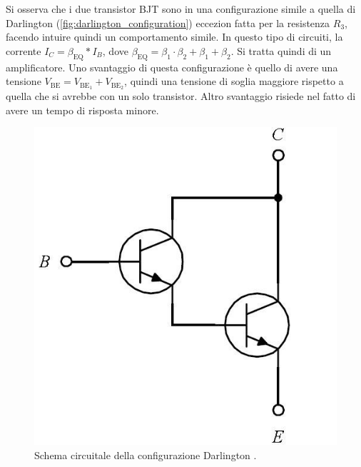 Si osserva che i due transistor BJT sono in una configurazione simile a quella di Darlington (\autoref*{fig:darlington_configuration}) eccezion 
fatta per la resistenza $R_3$, facendo intuire quindi un comportamento simile. In questo tipo di circuiti, la corrente $I_C=\beta_\text{EQ}*I_B$, 
dove $\beta_\text{EQ}=\beta_1 \cdot \beta_2+\beta_1+\beta_2$. Si tratta quindi di un amplificatore. Uno svantaggio di questa configurazione è quello
di avere una tensione $V_{\text{BE}} = V_{\text{BE}_1} + V_{\text{BE}_2}$, quindi una tensione di soglia maggiore rispetto a quella che si avrebbe 
con un solo transistor. Altro svantaggio risiede nel fatto di avere un tempo di risposta minore.
\begin{figure}[h!]
    \centering
    \includegraphics[width=.325\linewidth]{img/darlington_configuration.jpg}
    \caption{Schema circuitale della configurazione Darlington \cite{david_2019_}.}
    \label{fig:darlington_configuration}
\end{figure}

